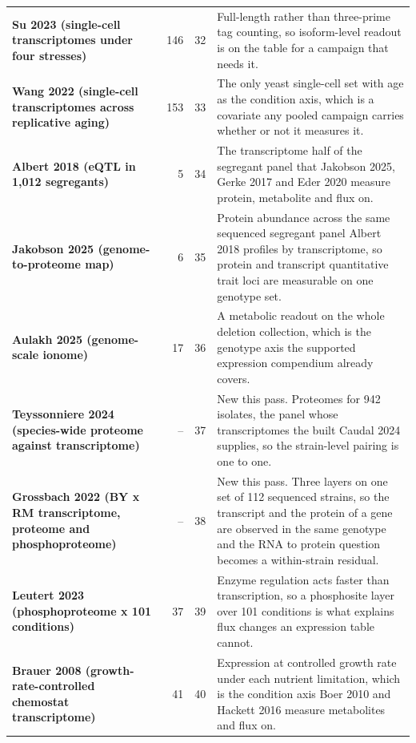 \begin{longtable}{@{}L{46mm} r@{\hspace{6pt}} r@{\hspace{6pt}} L{104mm}@{}}
\addlinespace[5pt]
\textbf{Su 2023 (single-cell transcriptomes under four stresses)} & 146 & 32 & Full-length rather than three-prime tag counting, so isoform-level readout is on the table for a campaign that needs it. \\
\addlinespace[5pt]
\textbf{Wang 2022 (single-cell transcriptomes across replicative aging)} & 153 & 33 & The only yeast single-cell set with age as the condition axis, which is a covariate any pooled campaign carries whether or not it measures it. \\
\addlinespace[5pt]
\textbf{Albert 2018 (eQTL in 1,012 segregants)} & 5 & 34 & The transcriptome half of the segregant panel that Jakobson 2025, Gerke 2017 and Eder 2020 measure protein, metabolite and flux on. \\
\addlinespace[5pt]
\textbf{Jakobson 2025 (genome-to-proteome map)} & 6 & 35 & Protein abundance across the same sequenced segregant panel Albert 2018 profiles by transcriptome, so protein and transcript quantitative trait loci are measurable on one genotype set. \\
\addlinespace[5pt]
\textbf{Aulakh 2025 (genome-scale ionome)} & 17 & 36 & A metabolic readout on the whole deletion collection, which is the genotype axis the supported expression compendium already covers. \\
\addlinespace[5pt]
\textbf{Teyssonniere 2024 (species-wide proteome against transcriptome)} & -- & 37 & New this pass. Proteomes for 942 isolates, the panel whose transcriptomes the built Caudal 2024 supplies, so the strain-level pairing is one to one. \\
\addlinespace[5pt]
\textbf{Grossbach 2022 (BY x RM transcriptome, proteome and phosphoproteome)} & -- & 38 & New this pass. Three layers on one set of 112 sequenced strains, so the transcript and the protein of a gene are observed in the same genotype and the RNA to protein question becomes a within-strain residual. \\
\addlinespace[5pt]
\textbf{Leutert 2023 (phosphoproteome x 101 conditions)} & 37 & 39 & Enzyme regulation acts faster than transcription, so a phosphosite layer over 101 conditions is what explains flux changes an expression table cannot. \\
\addlinespace[5pt]
\textbf{Brauer 2008 (growth-rate-controlled chemostat transcriptome)} & 41 & 40 & Expression at controlled growth rate under each nutrient limitation, which is the condition axis Boer 2010 and Hackett 2016 measure metabolites and flux on. \\

\end{longtable}
